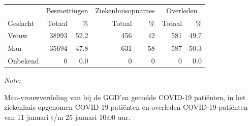\documentclass[
  english,
  man,floatsintext]{apa6}
\begin{document}
\begin{table}[H]
\centering\begingroup\fontsize{11}{13}\selectfont

\begin{threeparttable}
\begin{tabular}{lrrrrrr}
\toprule
\multicolumn{1}{c}{ } & \multicolumn{2}{c}{Besmettingen} & \multicolumn{2}{c}{Ziekenhuisopnames} & \multicolumn{2}{c}{Overleden} \\
\cmidrule(l{3pt}r{3pt}){2-3} \cmidrule(l{3pt}r{3pt}){4-5} \cmidrule(l{3pt}r{3pt}){6-7}
Geslacht & Totaal & \% & Totaal & \% & Totaal & \%\\
\midrule
Vrouw & 38993 & 52.2 & 456 & 42 & 581 & 49.7\\
Man & 35694 & 47.8 & 631 & 58 & 587 & 50.3\\
Onbekend & 0 & 0.0 & 0 & 0 & 0 & 0.0\\
\bottomrule
\end{tabular}
\begin{tablenotes}
\item \textit{Note: } 
\item Man-vrouwverdeling van bij de GGD’en gemelde COVID-19 patiënten, in het ziekenhuis opgenomen COVID-19 patiënten en overleden COVID-19 patiënten van 11 januari t/m 25 januari 10:00 uur.
\end{tablenotes}
\end{threeparttable}
\endgroup{}
\end{table}
\newpage
\end{document}
